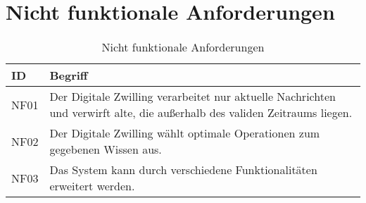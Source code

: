 \section{Nicht funktionale Anforderungen}

\begin{table}[h]
    \begin{tabular}{ l p{12cm}}
        ID & Begriff  \\
        \hline
        NF01 & Der Digitale Zwilling verarbeitet nur aktuelle Nachrichten und verwirft alte, die außerhalb des validen Zeitraums liegen. \\
        NF02 & Der Digitale Zwilling wählt optimale Operationen zum gegebenen Wissen aus. \\ 
        NF03 & Das System kann durch verschiedene Funktionalitäten erweitert werden. \\      
    \end{tabular}
    \caption{Nicht funktionale Anforderungen}\label{table:nicht Funktionale Anforderungen}
    
\end{table}